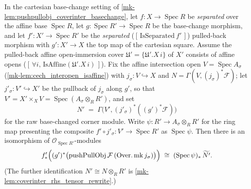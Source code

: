 \begin{lemma}\label{mk-lem:coverinter_rhs_iso_tilde}
  \leanok

  In the cartesian base-change setting of \ref{mk-lem:pushpullobj_coverinter_basechange}, let
  \(f : X \to \operatorname{Spec} R\) be \emph{separated} over the affine base
  \(\operatorname{Spec} R\), let \(g : \operatorname{Spec} R' \to \operatorname{Spec} R\) be the
  base-change morphism, and let \(f' : X' \to \operatorname{Spec} R'\) be the \emph{separated}
  (\([\,\mathrm{IsSeparated}\ f'\,]\)) pulled-back morphism with \(g' : X' \to X\) the top map of
  the cartesian square. Assume the pulled-back affine open-immersion cover
  \(\mathfrak{U}' = \{\mathfrak{U}'.X\, i\}\) of \(X'\) consists of affine opens
  (\([\,\forall i,\,\mathrm{IsAffine}(\mathfrak{U}'.X\,i)\,]\)). Fix the affine intersection
  open \(V = \operatorname{Spec} A_\sigma\) (\ref{mk-lem:cech_interopen_isaffine}) with
  \(j_\sigma : V \hookrightarrow X\) and \(N = \Gamma(V, (j_\sigma)^*\mathcal{F})\); let
  \(j'_\sigma : V' \hookrightarrow X'\) be the pullback of \(j_\sigma\) along \(g'\), so that
  \(V' = X' \times_X V = \operatorname{Spec}(A_\sigma \otimes_R R')\), and set
  \[
    N' \;=\; \Gamma\bigl(V', (j'_\sigma)^*((g')^*\mathcal{F})\bigr)
  \]
  for the raw base-changed corner module. Write \(\psi : R' \to A_\sigma \otimes_R R'\) for the
  ring map presenting the composite \(f' \circ j'_\sigma : V' \to \operatorname{Spec} R'\) as
  \(\operatorname{Spec}\psi\). Then there is an isomorphism of
  \(\mathcal{O}_{\operatorname{Spec} R'}\)-modules
  \[
    f'_*\Bigl((g')^*\bigl(\operatorname{pushPullObj}\mathcal{F}\,
      (\operatorname{Over.mk} j_\sigma)\bigr)\Bigr)
      \;\cong\; (\operatorname{Spec}\psi)_*\,\widetilde{N'}.
  \]
  (The further identification \(N' \cong N \otimes_R R'\) is
  \ref{mk-lem:coverinter_rhs_tensor_rewrite}.)
\end{lemma}
